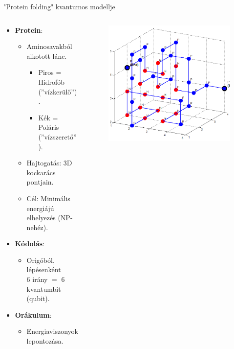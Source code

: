 \documentclass[aspectratio=169]{beamer}
\begin{document}
\begin{frame}{"Protein folding" kvantumos modellje}

\begin{columns}
\begin{column}{0.55\textwidth}
\vspace{-0.3cm}
\begin{itemize}
    \item \textbf{Protein}:
    \begin{itemize}
        \item Aminosavakból alkotott lánc.
        \begin{itemize}
          \item \color{red} Piros = Hidrofób (''vízkerülő'').
          \item \color{blue} Kék = Poláris (''vízszerető'').
        \end{itemize}
        \item Hajtogatás: 3D kockarács pontjain.
        \item Cél: Minimális energiájú elhelyezés (NP-nehéz).
    \end{itemize}
    \item \textbf{Kódolás}:
    \begin{itemize}
        \item Origóból, lépésenként \\$6$ irány $=$ $6$ kvantumbit (qubit).
    \end{itemize}
    \item \textbf{Orákulum}: 
    \begin{itemize}
        \item Energiaviszonyok lepontozása.
    \end{itemize}
\end{itemize}
\end{column}
\begin{column}{0.45\textwidth}
\vspace{-0.2cm}
\begin{figure}[H]
\center
\includegraphics[width=\textwidth]{./tdk_2022_figures/Protein-folds-with-length-36-amino-acids-18-contacts.png}

\end{figure}
\end{column}
\end{columns}
\end{frame}
\end{document}
